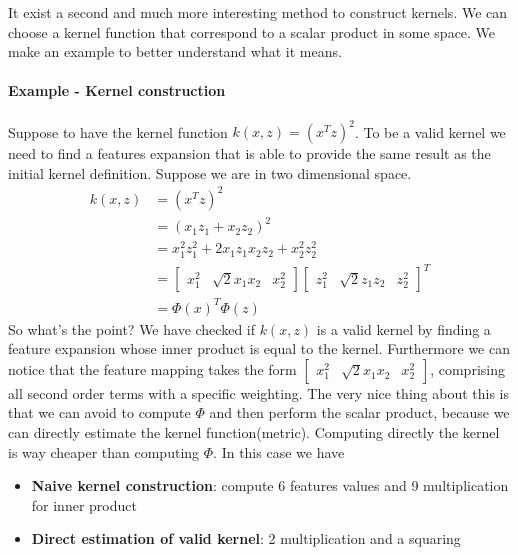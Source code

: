 \documentclass[main.tex]{subfiles}
\begin{document}
It exist a second and much more interesting method to construct kernels. We can choose a kernel function that correspond to a scalar product in some space. We make an example to better understand what it means.
\paragraph{Example - Kernel construction}Suppose to have the kernel function $k(x, z) = (x^T z)^2$.
To be a valid kernel we need to find a features expansion that is able to provide the same result as the initial kernel definition. Suppose we are in two dimensional space.
\begin{align*}
    k(x,z) & = (x^T z)^2                                                                                                                \\
           & = (x_1z_1 + x_2z_2)^2                                                                                                      \\
           & = x_1^2z_1^2 + 2x_1z_1x_2z_2 + x_2^2z_2^2                                                                                  \\
           & = \begin{bmatrix} x_1^2 & \sqrt{2}x_1x_2 & x_2^2\end{bmatrix}\begin{bmatrix} z_1^2 & \sqrt{2}z_1z_2 & z_2^2\end{bmatrix}^T \\
           & = \Phi(x)^T \Phi(z)
\end{align*}
So what's the point? We have checked if $k(x,z)$ is a valid kernel by finding a feature expansion whose inner product is equal to the kernel. Furthermore we can notice that the feature mapping takes the form $\begin{bmatrix} x_1^2 & \sqrt{2}x_1x_2 & x_2^2\end{bmatrix}$, comprising all second order terms with a specific weighting. The very nice thing about this is that we can avoid to compute $\Phi$ and then perform the scalar product, because we can directly estimate the kernel function(metric). Computing directly the kernel is way cheaper than computing $\Phi$.
In this case we have
\begin{itemize}
    \item \textbf{Naive kernel construction}: compute 6 features values and 9 multiplication for inner product
    \item \textbf{Direct estimation of valid kernel}: 2 multiplication and a squaring
\end{itemize}
\end{document}

